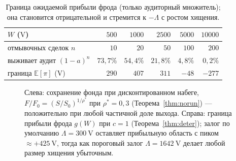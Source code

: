\documentclass[11pt]{article}
\theoremstyle{plain}
\theoremstyle{definition}
\theoremstyle{remark}
\newcommand{\V}{\mathrm{V}}
\begin{document}
\begin{table}[h]
\centering
\begin{tabular}{lrrrrr}
\toprule
$W$ ($\V$) & $500$ & $1000$ & $2500$ & $5000$ & $10000$\\
\midrule
отмывочных сделок $n$ & $10$ & $20$ & $50$ & $100$ & $200$\\
выживает аудит $(1-a)^n$ & $73{,}7\%$ & $54{,}4\%$ & $21{,}8\%$ & $4{,}8\%$ & $0{,}2\%$\\
граница $\mathbb{E}[\pi]$ ($\V$) & $290$ & $407$ & $311$ & $-48$ & $-277$\\
\bottomrule
\end{tabular}
\caption{Граница ожидаемой прибыли фрода (только аудиторный множитель); она становится отрицательной и стремится к $-\Lambda$ с ростом хищения.}
\label{tab:fraud}
\end{table}

\begin{figure}[t]
\centering
{}\hfill
{}
\caption{Слева: сохранение фонда при дисконтированном набеге, $F/F_0=(S/S_0)^{1/\rho^*}$ при $\rho^*=0{,}3$ (Теорема~\ref{thm:norun}) --- положительно при любой частичной доле выхода. Справа: граница прибыли фрода $g(W)$ при $c=1$ (Теорема~\ref{thm:deter}); залог по умолчанию $\Lambda=300~\V$ оставляет прибыльную область с пиком ${\approx}{+}425~\V$, тогда как пороговый залог $\Lambda=1642~\V$ делает любой размер хищения убыточным.}
\label{fig:analytic}
\end{figure}
\end{document}

